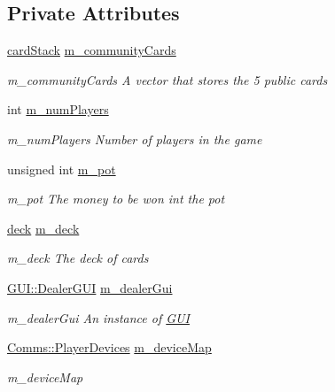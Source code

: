 \subsection*{Private Attributes}
\begin{DoxyCompactItemize}
\item 
\hyperlink{classcardStack}{card\-Stack} \hyperlink{classdealerLib_a8e0f7695dfb0064d41f0be114f602fd1}{m\-\_\-community\-Cards}
\begin{DoxyCompactList}\small\item\em m\-\_\-community\-Cards A vector that stores the 5 public cards \end{DoxyCompactList}\item 
int \hyperlink{classdealerLib_ab67ad8aae4bd1d568f7ff544e77637ad}{m\-\_\-num\-Players}
\begin{DoxyCompactList}\small\item\em m\-\_\-num\-Players Number of players in the game \end{DoxyCompactList}\item 
unsigned int \hyperlink{classdealerLib_a44da7b0e66a001b5ee6d79892bf1760d}{m\-\_\-pot}
\begin{DoxyCompactList}\small\item\em m\-\_\-pot The money to be won int the pot \end{DoxyCompactList}\item 
\hyperlink{classdeck}{deck} \hyperlink{classdealerLib_af93b35d9721bd502dbfb466992dcb55d}{m\-\_\-deck}
\begin{DoxyCompactList}\small\item\em m\-\_\-deck The deck of cards \end{DoxyCompactList}\item 
\hyperlink{classGUI_1_1DealerGUI}{G\-U\-I\-::\-Dealer\-G\-U\-I} \hyperlink{classdealerLib_a04b7aa090dc5a23264e77418946db4d3}{m\-\_\-dealer\-Gui}
\begin{DoxyCompactList}\small\item\em m\-\_\-dealer\-Gui An instance of \hyperlink{namespaceGUI}{G\-U\-I} \end{DoxyCompactList}\item 
\hyperlink{namespaceComms_ae7f8ecf87c32fe890069143ff75f2885}{Comms\-::\-Player\-Devices} \hyperlink{classdealerLib_a3e872bd8878756753531b3cc3d3a93aa}{m\-\_\-device\-Map}
\begin{DoxyCompactList}\small\item\em m\-\_\-device\-Map \end{DoxyCompactList}\item 

\end{DoxyCompactItemize}
